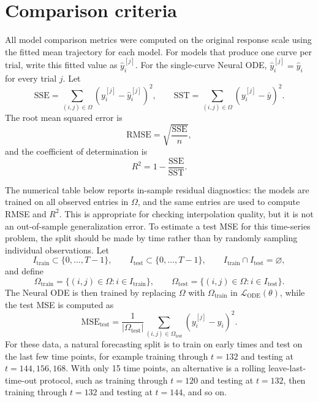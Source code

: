 \documentclass[11pt]{article}
\begin{document}
\section{Comparison criteria}

All model comparison metrics were computed on the original response scale using
the fitted mean trajectory for each model. For models that produce one curve per
trial, write this fitted value as $\widehat y_i^{[j]}$. For the single-curve
Neural ODE, $\widehat y_i^{[j]}=\widehat y_i$ for every trial $j$. Let
$$
  \mathrm{SSE}
  =
  \sum_{(i,j)\in\Omega}(y_i^{[j]}-\widehat y_i^{[j]})^2,
  \qquad
  \mathrm{SST}
  =
  \sum_{(i,j)\in\Omega}(y_i^{[j]}-\bar y)^2.
$$
The root mean squared error is
$$
  \mathrm{RMSE}
  =
  \sqrt{\frac{\mathrm{SSE}}{n}},
$$
and the coefficient of determination is
$$
  R^2
  =
  1-\frac{\mathrm{SSE}}{\mathrm{SST}}.
$$

The numerical table below reports in-sample residual diagnostics: the models
are trained on all observed entries in $\Omega$, and the same entries are used
to compute RMSE and $R^2$. This is appropriate for checking interpolation
quality, but it is not an out-of-sample generalization error. To estimate a
test MSE for this time-series problem, the split should be made by time rather
than by randomly sampling individual observations. Let
$$
  I_{\mathrm{train}}\subset \{0,\ldots,T-1\},
  \qquad
  I_{\mathrm{test}}\subset \{0,\ldots,T-1\},
  \qquad
  I_{\mathrm{train}}\cap I_{\mathrm{test}}=\varnothing,
$$
and define
$$
  \Omega_{\mathrm{train}}
  =
  \{(i,j)\in\Omega:i\in I_{\mathrm{train}}\},
  \qquad
  \Omega_{\mathrm{test}}
  =
  \{(i,j)\in\Omega:i\in I_{\mathrm{test}}\}.
$$
The Neural ODE is then trained by replacing $\Omega$ with
$\Omega_{\mathrm{train}}$ in $\mathcal L_{\mathrm{ODE}}(\theta)$, while the test
MSE is computed as
$$
  \mathrm{MSE}_{\mathrm{test}}
  =
  \frac{1}{|\Omega_{\mathrm{test}}|}
  \sum_{(i,j)\in\Omega_{\mathrm{test}}}
  \left(y_i^{[j]}-\widehat y_i\right)^2.
$$
For these data, a natural forecasting split is to train on early times and test
on the last few time points, for example training through $t=132$ and testing
at $t=144,156,168$. With only 15 time points, an alternative is a rolling
leave-last-time-out protocol, such as training through $t=120$ and testing at
$t=132$, then training through $t=132$ and testing at $t=144$, and so on.
\end{document}
